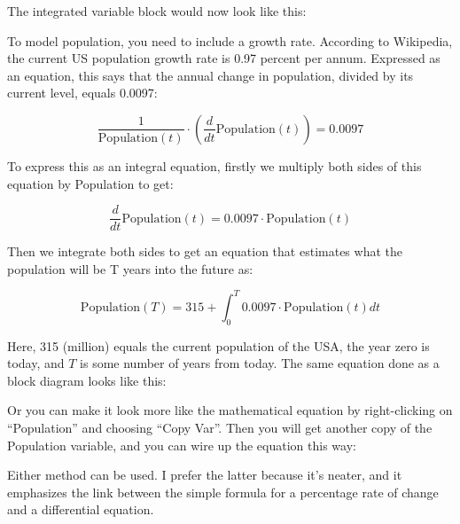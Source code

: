 \begin{description}
\begin{center}
\end{center}


The integrated variable block would now look like this:

\begin{center}
\end{center}


To model population, you need to include a growth rate. According to
Wikipedia, the current US population growth rate is 0.97 percent per
annum.  Expressed as an equation, this says that the annual change in
population, divided by its current level, equals 0.0097: 

\begin{displaymath}
\frac{1}{\mathrm{Population}(t)}\cdot\left(\frac{d}{dt}\mathrm{Population}(t)\right)=0.0097
\end{displaymath}

To express this as an integral equation, firstly we multiply both
sides of this equation by Population to get:

\begin{displaymath}
\frac{d}{dt}\mathrm{Population}(t)=0.0097\cdot\mathrm{Population}(t)
\end{displaymath}

Then we integrate both sides to get an equation that estimates what
the population will be T years into the future as:

\begin{displaymath}
\mathrm{Population}(T)=315+\int_0^T 0.0097\cdot\mathrm{Population}(t)
dt
\end{displaymath}

Here, 315 (million) equals the current population of the USA, the year
zero is today, and $T$ is some number of years from today. The same
equation done as a block diagram looks like this: 



Or you can make it look more like the mathematical equation by
right-clicking on ``Population'' and choosing ``Copy Var''. Then you will
get another copy of the Population variable, and you can wire up the
equation this way:


Either method can be used. I prefer the latter because it's neater,
and it emphasizes the link between the simple formula for a percentage
rate of change and a differential equation. 


\end{description}
